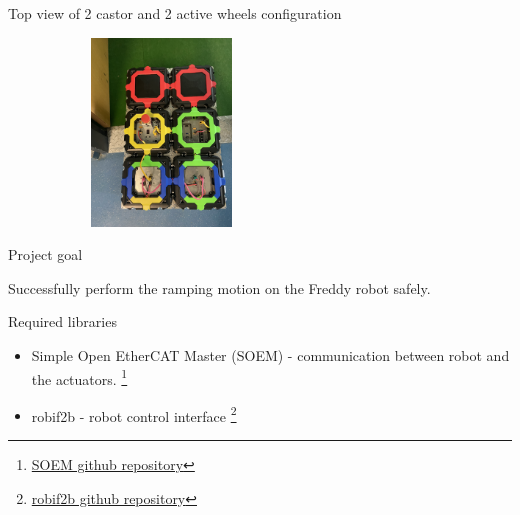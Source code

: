 \documentclass{beamer}
\begin{document}
\begin{frame}{Top view of 2 castor and 2 active wheels configuration}

      \begin{figure}[H]
            \centering
            \includegraphics[width= 6cm, height= 5cm,angle=270,origin=c]{top_view.jpg}
        \end{figure}
\end{frame}

\begin{frame}{Project goal}
\begin{tcolorbox}[colback=blue!5!white,colframe=blue!75!black]
Successfully perform the ramping motion on the Freddy robot safely.
\end{tcolorbox}

\end{frame}


\begin{frame}{Required libraries}
\begin{itemize}
    \item Simple Open EtherCAT Master (SOEM) - communication between robot and the actuators. \footnote{\href{https://github.com/OpenEtherCATsociety/SOEM}{SOEM github repository}}
    \item robif2b - robot control interface \footnote{\href{https://github.com/rosym-project/robif2b}{robif2b github repository}}

\end{itemize}


\end{frame}
\end{document}
